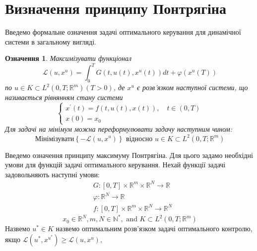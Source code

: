 \documentclass[a4paper,12pt]{extreport}
\newtheorem{corollary}{Означення}[theorem]
\begin{document}
\section{Визначення принципу Понтрягіна} 
Введемо формальне означення задачі оптимального керування для динамічної системи в загальному вигляді. 
    \begin{corollary}
    Максимізувати функціонал
    \begin{equation} \label{eq:2_1}
      \mathcal{L}\left(u, x^u\right)=\int_0^T G\left(t, u(t), x^u(t)\right) d t+\varphi\left(x^u(T)\right)
    \end{equation}   
    \newline по
    $u \in K \subset L^2\left(0, T ; \mathbb{R}^m\right)(T>0)$, де  $x^u$ є розв'язком наступної системи, що називається рівнянням стану системи
    \begin{equation} \label{eq:2_2}
        \left\{\begin{array}{l}
        x^{\prime}(t)=f(t, u(t), x(t)), \quad t \in(0, T) \\
        x(0)=x_0
        \end{array}\right.
    \end{equation}
    Для задачі на мінімум можна переформулювати задачу наступним чином:
    $$ \text{Мінімізувати}  \left\{-\mathcal{L}\left(u, x^u\right)\right\}
    \text { відносно } u \in K \subset L^2\left(0, T ; \mathbb{R}^m\right)$$

    \end{corollary} 
Введемо означення принципу максимуму Понтрягіна. Для цього задамо необхідні умови для функцій задачі оптимального керування.
Нехай функції задачі задовольняють наступні умови:
    $$
    \begin{aligned}
    &G:[0, T] \times \mathbb{R}^m \times \mathbb{R}^N \rightarrow \mathbb{R} \\
    &\varphi: \mathbb{R}^N \rightarrow \mathbb{R} \\
    &f:[0, T] \times \mathbb{R}^m \times \mathbb{R}^N \rightarrow \mathbb{R}^N
    \end{aligned}
    $$
$$
    x_0 \in \mathbb{R}^N, m, N \in \mathbb{N}^*, \text { and } K \subset L^2\left(0, T ; \mathbb{R}^m\right)
$$
    Назвемо $u^* \in K$ назвемо  оптимальним розв'язком задачі оптимального контролю, якщо
    $\mathcal{L}\left(u^*, x^{u^*}\right) \geq \mathcal{L}\left(u, x^u\right),$
\end{document}

